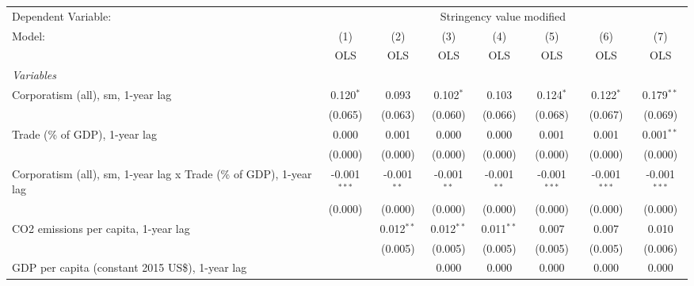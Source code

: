 
\begingroup
\centering
\begin{tabular}{lccccccc}
   \toprule
   Dependent Variable: & \multicolumn{7}{c}{Stringency value modified}\\
   Model:                                                             & (1)            & (2)           & (3)           & (4)           & (5)            & (6)            & (7)\\  
                                                                      &  OLS           & OLS           & OLS           & OLS           & OLS            & OLS            & OLS\\  
   \midrule
   \emph{Variables}\\
   Corporatism (all), sm, 1-year lag                                  & 0.120$^{*}$    & 0.093         & 0.102$^{*}$   & 0.103         & 0.124$^{*}$    & 0.122$^{*}$    & 0.179$^{**}$\\   
                                                                      & (0.065)        & (0.063)       & (0.060)       & (0.066)       & (0.068)        & (0.067)        & (0.069)\\   
   Trade (\% of GDP), 1-year lag                                      & 0.000          & 0.001         & 0.000         & 0.000         & 0.001          & 0.001          & 0.001$^{**}$\\   
                                                                      & (0.000)        & (0.000)       & (0.000)       & (0.000)       & (0.000)        & (0.000)        & (0.000)\\   
   Corporatism (all), sm, 1-year lag x Trade (\% of GDP), 1-year lag  & -0.001$^{***}$ & -0.001$^{**}$ & -0.001$^{**}$ & -0.001$^{**}$ & -0.001$^{***}$ & -0.001$^{***}$ & -0.001$^{***}$\\   
                                                                      & (0.000)        & (0.000)       & (0.000)       & (0.000)       & (0.000)        & (0.000)        & (0.000)\\   
   CO2 emissions per capita, 1-year lag                               &                & 0.012$^{**}$  & 0.012$^{**}$  & 0.011$^{**}$  & 0.007          & 0.007          & 0.010\\   
                                                                      &                & (0.005)       & (0.005)       & (0.005)       & (0.005)        & (0.005)        & (0.006)\\   
   GDP per capita (constant 2015 US\$), 1-year lag                    &                &               & 0.000         & 0.000         & 0.000          & 0.000          & 0.000\\   

\end{tabular}
